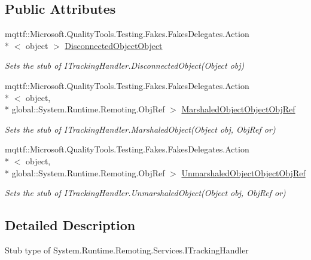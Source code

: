 \subsection*{Public Attributes}
\begin{DoxyCompactItemize}
\item 
mqttf\-::\-Microsoft.\-Quality\-Tools.\-Testing.\-Fakes.\-Fakes\-Delegates.\-Action\\*
$<$ object $>$ \hyperlink{class_system_1_1_runtime_1_1_remoting_1_1_services_1_1_fakes_1_1_stub_i_tracking_handler_ae7f28c0fe86668739b8d51b3176a2058}{Disconnected\-Object\-Object}
\begin{DoxyCompactList}\small\item\em Sets the stub of I\-Tracking\-Handler.\-Disconnected\-Object(\-Object obj)\end{DoxyCompactList}\item 
mqttf\-::\-Microsoft.\-Quality\-Tools.\-Testing.\-Fakes.\-Fakes\-Delegates.\-Action\\*
$<$ object, \\*
global\-::\-System.\-Runtime.\-Remoting.\-Obj\-Ref $>$ \hyperlink{class_system_1_1_runtime_1_1_remoting_1_1_services_1_1_fakes_1_1_stub_i_tracking_handler_afd033d49fca9c93a274cfc5e05d43698}{Marshaled\-Object\-Object\-Obj\-Ref}
\begin{DoxyCompactList}\small\item\em Sets the stub of I\-Tracking\-Handler.\-Marshaled\-Object(\-Object obj, Obj\-Ref or)\end{DoxyCompactList}\item 
mqttf\-::\-Microsoft.\-Quality\-Tools.\-Testing.\-Fakes.\-Fakes\-Delegates.\-Action\\*
$<$ object, \\*
global\-::\-System.\-Runtime.\-Remoting.\-Obj\-Ref $>$ \hyperlink{class_system_1_1_runtime_1_1_remoting_1_1_services_1_1_fakes_1_1_stub_i_tracking_handler_af11cda62ad5f75391507567e2d947a46}{Unmarshaled\-Object\-Object\-Obj\-Ref}
\begin{DoxyCompactList}\small\item\em Sets the stub of I\-Tracking\-Handler.\-Unmarshaled\-Object(\-Object obj, Obj\-Ref or)\end{DoxyCompactList}\end{DoxyCompactItemize}


\subsection{Detailed Description}
Stub type of System.\-Runtime.\-Remoting.\-Services.\-I\-Tracking\-Handler



